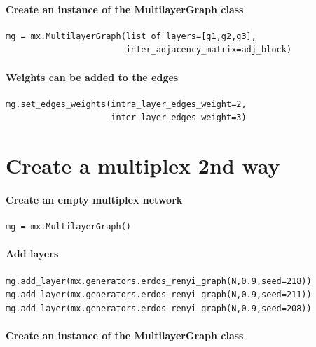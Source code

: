 \documentclass[]{article}
\begin{document}
\paragraph{Create an instance of the MultilayerGraph
class}\label{create-an-instance-of-the-multilayergraph-class}

\begin{verbatim}
mg = mx.MultilayerGraph(list_of_layers=[g1,g2,g3],
                        inter_adjacency_matrix=adj_block)
\end{verbatim}

\paragraph{Weights can be added to the
edges}\label{weights-can-be-added-to-the-edges}

\begin{verbatim}
mg.set_edges_weights(intra_layer_edges_weight=2,
                     inter_layer_edges_weight=3)
\end{verbatim}

\section{Create a multiplex 2nd way}\label{create-a-multiplex-2nd-way}

\paragraph{Create an empty multiplex
network}\label{create-an-empty-multiplex-network}

\begin{verbatim}
mg = mx.MultilayerGraph()
\end{verbatim}

\paragraph{Add layers}\label{add-layers}

\begin{verbatim}
mg.add_layer(mx.generators.erdos_renyi_graph(N,0.9,seed=218))
mg.add_layer(mx.generators.erdos_renyi_graph(N,0.9,seed=211))
mg.add_layer(mx.generators.erdos_renyi_graph(N,0.9,seed=208))
\end{verbatim}

\paragraph{Create an instance of the MultilayerGraph
class}\label{create-an-instance-of-the-multilayergraph-class-1}
\end{document}
